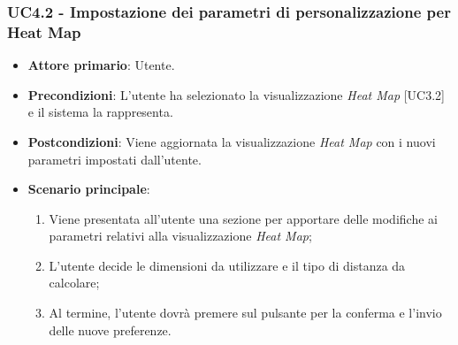 \subsubsection{UC4.2 - Impostazione dei parametri di personalizzazione per Heat Map}
\begin{itemize}
	\item \textbf{Attore primario}: Utente.
	\item \textbf{Precondizioni}: L'utente ha selezionato la visualizzazione \textit{Heat Map} [UC3.2] e il sistema la rappresenta.
	\item \textbf{Postcondizioni}: Viene aggiornata la visualizzazione \textit{Heat Map} con i nuovi parametri impostati dall'utente.
	\item \textbf{Scenario principale}:
	\begin{enumerate}
			\item Viene presentata all'utente una sezione per apportare delle modifiche ai parametri relativi alla visualizzazione \textit{Heat Map};
			\item L'utente decide le dimensioni da utilizzare e il tipo di distanza da calcolare;
			\item Al termine, l'utente dovrà premere sul pulsante per la conferma e l'invio delle nuove preferenze.
		\end{enumerate}
\end{itemize}